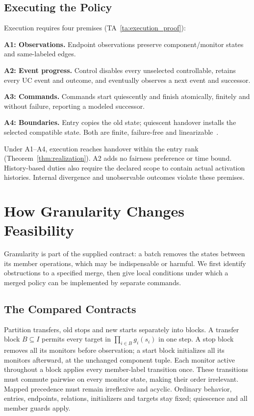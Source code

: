 \documentclass[acmsmall,screen,review,anonymous]{acmart}
\begin{document}
\subsection{Executing the Policy}
\label{sec:runtime-boundary}

Execution requires four premises (TA~\ref{ta:execution_proof}):
\par\noindent\textbf{A1: Observations.} Endpoint observations preserve component/monitor states and same-labeled edges.
\par\noindent\textbf{A2: Event progress.} Control disables every unselected controllable, retains every UC event and outcome, and eventually observes a next event and successor.
\par\noindent\textbf{A3: Commands.} Commands start quiescently and finish atomically, finitely and without failure, reporting a modeled successor.
\par\noindent\textbf{A4: Boundaries.} Entry copies the old state; quiescent handover installs the selected compatible state. Both are finite, failure-free and linearizable~\cite{HerlihyWing1990}.

Under A1--A4, execution reaches handover within the entry rank (Theorem~\ref{thm:realization}). A2 adds no fairness preference or time bound. History-based duties also require the declared scope to contain actual activation histories. Internal divergence and unobservable outcomes violate these premises.

\section{How Granularity Changes Feasibility}
\label{sec:granularity-analysis}
Granularity is part of the supplied contract: a batch removes the states between its member operations, which may be indispensable or harmful. We first identify obstructions to a specified merge, then give local conditions under which a merged policy can be implemented by separate commands.

\subsection{The Compared Contracts}\label{sec:granularity-contracts}
Partition transfers, old stops and new starts separately into blocks. A transfer block $B\subseteq I$ permits every target in $\prod_{i\in B}g_i(s_i)$ in one step. A stop block removes all its monitors before observation; a start block initializes all its monitors afterward, at the unchanged component tuple. Each monitor active throughout a block applies every member-label transition once. These transitions must commute pairwise on every monitor state, making their order irrelevant. Mapped precedence must remain irreflexive and acyclic. Ordinary behavior, entries, endpoints, relations, initializers and targets stay fixed; quiescence and all member guards apply.
\end{document}
